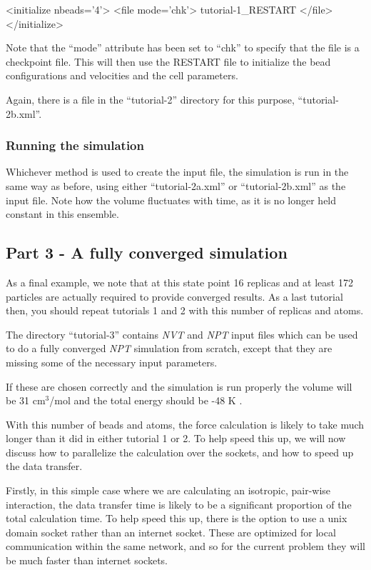 \documentclass[11pt,english,fleqn]{report}
\newenvironment{code}{%
\footnotesize 
\verbatim
}{
\endverbatim
\normalsize
}
\begin{document}
\begin{code}
<initialize nbeads='4'>
   <file mode='chk'> tutorial-1_RESTART </file>
</initialize>
\end{code}

Note that the {}``mode'' attribute has been set to {}``chk''
to specify that the file is a checkpoint file.
This will then use the RESTART file to initialize the bead
configurations and velocities and the cell parameters.

Again, there is a file in the {}``tutorial-2'' directory
for this purpose, {}``tutorial-2b.xml''.

\subsubsection{Running the simulation}

Whichever method is used to create the input file, the simulation
is run in the same way as before, using either
{}``tutorial-2a.xml'' or {}``tutorial-2b.xml'' as the input file. 
Note how the volume fluctuates with time, as it is no longer held
constant in this ensemble.

\subsection{Part 3 - A fully converged simulation}

As a final example, we note that at this state point 16 replicas
and at least 172 particles are actually 
required to provide converged results.
As a last tutorial then, you should repeat tutorials 1 and 2 with
this number of replicas and atoms. 

The directory {}``tutorial-3'' contains 
\emph{NVT} and \emph{NPT} input files which can be used to do a fully converged
\emph{NPT} simulation from scratch, except that they are missing some
of the necessary input parameters.

If these are chosen correctly and the simulation is run properly
the volume will be 31 \(\textrm{cm}^3\)/mol and the total energy
should be -48 K \cite{mart+99jcp}.

With this number of beads and atoms, the force calculation is likely
to take much longer than it did in either tutorial 1 or 2.
To help speed this up, we will now discuss how to parallelize the
calculation over the sockets, and how to speed up the data transfer.

Firstly, in this simple case where we are calculating an isotropic,
pair-wise interaction, the data transfer time is likely to be a
significant proportion of the total calculation time. To help speed this
up, there is the option to use a unix domain socket rather than an
internet socket. These are optimized for local communication within
the same network, and so for the current problem they will be much
faster than internet sockets.
\end{document}
